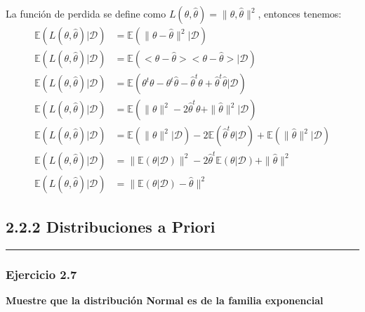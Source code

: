 \documentclass[12pt,]{article}
\begin{document}
La función de perdida se define como
\(L(\theta, \hat{\theta})=\|\theta, \hat{\theta}\|^2\), entonces
tenemos: \[
\begin{array}{rl}
\mathbb{E}(L(\theta, \hat{\theta})|\mathcal{D}) & = \mathbb{E}(\|\theta- \hat{\theta}\|^2|\mathcal{D})\\
\mathbb{E}(L(\theta, \hat{\theta})|\mathcal{D}) & = \mathbb{E}(<\theta-\hat{\theta}><\theta-\hat{\theta}>|\mathcal{D})\\
\mathbb{E}(L(\theta, \hat{\theta})|\mathcal{D}) & = \mathbb{E}(\theta^t\theta-\theta^t\hat{\theta}-\hat{\theta}^t\theta+\hat{\theta}^t\hat{\theta}|\mathcal{D})\\
\mathbb{E}(L(\theta, \hat{\theta})|\mathcal{D}) & = \mathbb{E}(\|\theta\|^2-2\hat{\theta}^t\theta+\|\hat{\theta}\|^2|\mathcal{D})\\
\mathbb{E}(L(\theta, \hat{\theta})|\mathcal{D}) & = \mathbb{E}(\|\theta\|^2|\mathcal{D})-2\mathbb{E}(\hat{\theta}^t\theta|\mathcal{D})+\mathbb{E}(\|\hat{\theta}\|^2|\mathcal{D})\\
\mathbb{E}(L(\theta, \hat{\theta})|\mathcal{D}) & = \| \mathbb{E}(\theta|\mathcal{D})\|^2-2\hat{\theta}^t\mathbb{E}(\theta|\mathcal{D})+\|\hat{\theta}\|^2\\
\mathbb{E}(L(\theta, \hat{\theta})|\mathcal{D}) & = \| \mathbb{E}(\theta|\mathcal{D})-\hat{\theta}\|^2
\end{array}
\]

\subsection{2.2.2 Distribuciones a
Priori}\label{distribuciones-a-priori}

\begin{center}\rule{0.5\linewidth}{\linethickness}\end{center}

\subsubsection{Ejercicio 2.7}\label{ejercicio-2.7}

\textbf{Muestre que la distribución Normal es de la familia exponencial}
\end{document}
